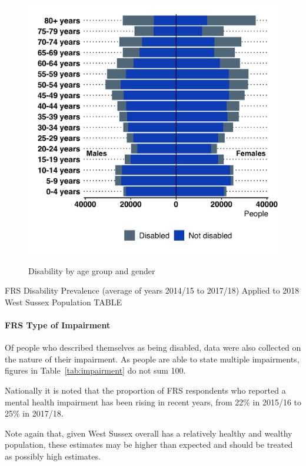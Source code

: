 \begin{figure}[htp]
    \caption{Disability by age group and gender}
    \centering
	\includegraphics[width=\linewidth]{images/frs_disability_wsx.png}
	\label{fig:frs_diab_wsx}
\end{figure}

FRS Disability Prevalence (average of years 2014/15 to 2017/18) Applied to 2018 West Sussex Population TABLE

\paragraph{FRS Type of Impairment} Of people who described themselves as being disabled, data were also collected on the nature of their impairment. As people are able to state multiple impairments, figures in Table~\ref{tab:impairment} do not sum 100.

Nationally it is noted that the proportion of FRS respondents who reported a mental health impairment has been rising in recent years, from 22\% in 2015/16 to 25\% in 2017/18.

Note again that, given West Sussex overall has a relatively healthy and wealthy population, these estimates may be higher than expected and should be treated as possibly high estimates.

